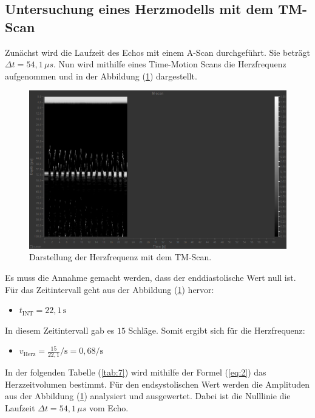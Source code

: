 \subsection{Untersuchung eines Herzmodells mit dem TM-Scan}
Zunächst wird die Laufzeit des Echos mit einem A-Scan durchgeführt.
Sie beträgt $\Delta t = 54,1 \, \mu s$.
Nun wird mithilfe eines Time-Motion Scans die Herzfrequenz aufgenommen und
in der Abbildung (\ref{abb:7}) dargestellt.
\begin{figure}[H]
  \centering
  \includegraphics[width=\textwidth]{content/HZV.png}
  \caption{Darstellung der Herzfrequenz mit dem TM-Scan.}
  \label{abb:7}
\end{figure}
Es muss die Annahme gemacht werden, dass der enddiastolische Wert null ist.
Für das Zeitintervall geht aus der Abbildung (\ref{abb:7}) hervor:

\begin{itemize}
  \item $t_{\text{INT}} = 22,1 \, \si{\second}$
\end{itemize}

In diesem Zeitintervall gab es $15$ Schläge.
Somit ergibt sich für die Herzfrequenz:

\begin{itemize}
  \item $v_{\text{Herz}} = \frac{15}{22,1} \si{\per\second} = 0,68 \si{\per\second}$
\end{itemize}

In der folgenden Tabelle (\ref{tab:7}) wird mithilfe der Formel (\ref{eq:2}) das Herzzeitvolumen
bestimmt. Für den endsystolischen Wert werden die Amplituden aus der Abbildung (\ref{abb:7}) analysiert und
ausgewertet. Dabei ist die Nulllinie die Laufzeit $\Delta t = 54,1 \, \mu s$ vom Echo.

